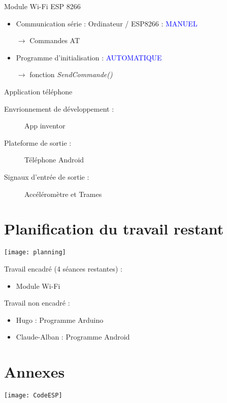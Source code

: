 \documentclass[12pt,unknownkeysallowed]{beamer}
\begin{document}
    \begin{frame}{\insertsection}{Module Wi-Fi ESP 8266}
        \begin{itemize}
            \item Communication série : Ordinateur / ESP8266 : \textcolor{blue}{MANUEL}
            
                 $\rightarrow $ Commandes  AT
                
        \end{itemize}
        
        \begin{itemize}
             \item Programme d'initialisation :  \textcolor{blue}{AUTOMATIQUE}
             
                 $\rightarrow $ fonction  \textit{SendCommande()}
                
        \end{itemize}
        
    \end{frame}
    
    \begin{frame}{\insertsection}{Application téléphone}
        \begin{description}
            \item[Envrionnement de développement : ] App inventor
            \item[Plateforme de sortie : ] Téléphone Android
            \item[Signaux d'entrée de sortie : ] Accéléromètre et Trames
        \end{description}
    \end{frame}

\section{Planification du travail restant}

    \begin{frame}{\insertsection}
    
    \texttt{[image: planning]}
    
        Travail encadré (4 séances restantes) :
        \begin{itemize}
            \item Module Wi-Fi
        \end{itemize}
        
        Travail non encadré : 
        \begin{itemize}
            \item Hugo : Programme Arduino
            \item Claude-Alban : Programme Android
        \end{itemize}
    
    \end{frame}

\section{Annexes}

    \begin{frame}{\insertsection}
      \texttt{[image: CodeESP]}
    \end{frame}
\end{document}
